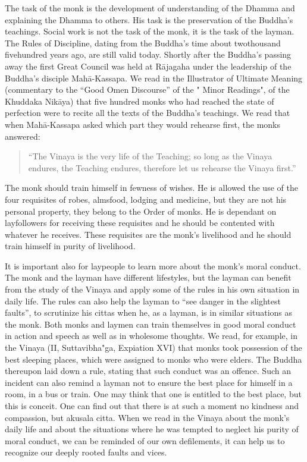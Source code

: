 \documentclass{book}
\begin{document}
The task of the monk is the development of under­standing of the Dhamma
and explaining the Dhamma to others. His task is the preservation of the
Buddha's teachings. Social work is not the task of the monk, it is the
task of the layman. The Rules of Discipline, dating from the Buddha's
time about twothousand fivehundred years ago, are still valid today.
Shortly after the Buddha's passing away the first Great Council was held
at Rājagaha under the leadership of the Buddha's disciple Mahā-Kassapa.
We read in the Illustrator of Ultimate Meaning (commentary to the ``Good
Omen Discourse'' of the " Minor Readings", of the Khuddaka Nikāya) that
five hundred monks who had reached the state of perfection were to
recite all the texts of the Buddha's teachings. We read that when
Mahā-Kassapa asked which part they would rehearse first, the monks
answered:

\begin{quote}
``The Vinaya is the very life of the Teaching; so long as the Vinaya
endures, the Teaching endures, therefore let us rehearse the Vinaya
first.''
\end{quote}

The monk should train himself in fewness of wishes. He is allowed the
use of the four requisites of robes, almsfood, lodging and medicine, but
they are not his personal property, they belong to the Order of monks.
He is dependant on layfollowers for receiving these requisites and he
should be contented with whatever he receives. These requisites are the
monk's livelihood and he should train himself in purity of livelihood.

It is important also for laypeople to learn more about the monk's moral
conduct. The monk and the layman have different lifestyles, but the
layman can benefit from the study of the Vinaya and apply some of the
rules in his own situation in daily life. The rules can also help the
layman to ``see danger in the slightest faults'', to scrutinize his
cittas when he, as a layman, is in similar situations as the monk. Both
monks and laymen can train themselves in good moral conduct in action
and speech as well as in wholesome thoughts. We read, for example, in
the Vinaya (II, Suttavibha"ga, Expiation XVI) that monks took possession
of the best sleeping places, which were assigned to monks who were
elders. The Buddha thereupon laid down a rule, stating that such conduct
was an offence. Such an incident can also remind a layman not to ensure
the best place for himself in a room, in a bus or train. One may think
that one is entitled to the best place, but this is conceit. One can
find out that there is at such a moment no kindness and compassion, but
akusala citta. When we read in the Vinaya about the monk's daily life
and about the situations where he was tempted to neglect his purity of
moral conduct, we can be reminded of our own defilements, it can help us
to recognize our deeply rooted faults and vices.
\end{document}

